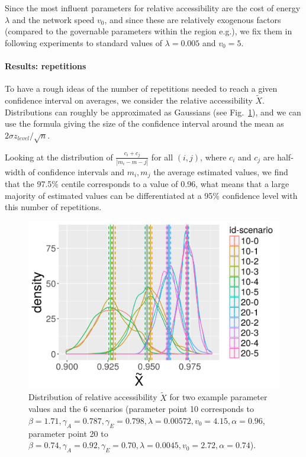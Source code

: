 Since the most influent parameters for relative accessibility are the cost of energy $\lambda$ and the network speed $v_0$, and since these are relatively exogenous factors (compared to the governable parameters within the region e.g.), we fix them in following experiments to standard values of $\lambda = 0.005$ and $v_0 = 5$.


\paragraph{Results: repetitions}

To have a rough ideas of the number of repetitions needed to reach a given confidence interval on averages, we consider the relative accessibility $\tilde{X}$. Distributions can roughly be approximated as Gaussians (see Fig.~\ref{fig:distrib-access}), and we can use the formula giving the size of the confidence interval around the mean as $2\sigma z_{level} / \sqrt{n}$.

Looking at the distribution of $\frac{c_i + c_j}{\left|m_i - m-j\right|}$ for all $(i,j)$, where $c_i$ and $c_j$ are half-width of confidence intervals and $m_i,m_j$ the average estimated values, we find that the 97.5\% centile corresponds to a value of 0.96, what means that a large majority of estimated values can be differentiated at a 95\% confidence level with this number of repetitions.


\begin{figure}
	\includegraphics[width=\textwidth]{figures/20180417_184334_SPACEMATTERS_distrib_relativeAccessibility.png}
	\caption{Distribution of relative accessibility $\tilde{X}$ for two example parameter values and the 6 scenarios (parameter point 10 corresponds to $\beta = 1.71,\gamma_A=0.787,\gamma_E=0.798,\lambda=0.00572,v_0=4.15,\alpha=0.96$, parameter point 20 to $\beta = 0.74,\gamma_A=0.92,\gamma_E=0.70,\lambda=0.0045,v_0=2.72,\alpha=0.74$).\label{fig:distrib-access}}
\end{figure}



